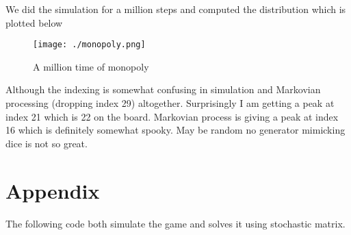\documentclass[]{article}
\begin{document}
We did the simulation for a million steps and computed the distribution
which is plotted below

\begin{figure}[htbp]
\centering
\texttt{[image: ./monopoly.png]}
\caption{A million time of monopoly}
\end{figure}

Although the indexing is somewhat confusing in simulation and Markovian
processing (dropping index 29) altogether. Surprisingly I am getting a
peak at index 21 which is 22 on the board. Markovian process is giving a
peak at index 16 which is definitely somewhat spooky. May be random no
generator mimicking dice is not so great.

\section{Appendix}\label{appendix}

The following code both simulate the game and solves it using stochastic
matrix.

\begin{scriptsize}
    
\end{scriptsize}
\end{document}
